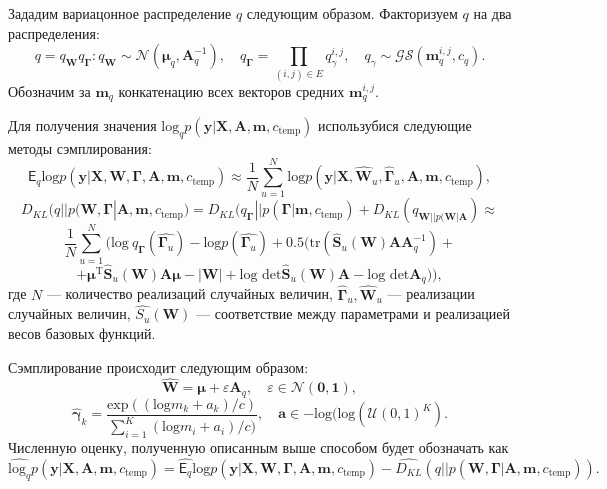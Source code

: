 Зададим вариацонное распределение $q$ следующим образом. 
Факторизуем $q$ на два распределения: 
$$q = q_{\mathbf{W}}q_{\boldsymbol{\Gamma}}:
q_{\mathbf{W}} \sim \mathcal{N}(\boldsymbol{\mu}_q, \mathbf{A}^{-1}_q), \quad q_{\boldsymbol{\Gamma}} = \prod_{(i,j) \in E} q_\gamma^{i,j}, \quad q_\gamma \sim \mathcal{GS}( \mathbf{m}_q^{i,j}, c_q).$$
Обозначим за $\mathbf{m}_q$ конкатенацию всех векторов средних  $\mathbf{m}_q^{i,j}$.

Для получения значения $\text{log}_q {p}(\mathbf{y}|\mathbf{X},\mathbf{A},\mathbf{m}, c_{\text{temp}})$ использубися следующие методы сэмплирования:
$$
    \mathsf{E}_{q}\text{log} p(\mathbf{y}|\mathbf{X},\mathbf{W}, \boldsymbol{\Gamma}, \mathbf{A},\mathbf{m}, c_{\text{temp}}) \approx \frac{1}{N}\sum_{u =1}^{N} \text{log} p(\mathbf{y}|\mathbf{X},\hat{\mathbf{W}}_u, \hat{\boldsymbol{\Gamma}}_u, \mathbf{A},\mathbf{m}, c_{\text{temp}}),
$$
$$
   {D_{KL}}(q||p(\mathbf{W}, \boldsymbol{\Gamma}| \mathbf{A},\mathbf{m}, c_{\text{temp}}) = {D_{KL}}(q_{\boldsymbol{\Gamma}}||p(\boldsymbol{\Gamma}| \mathbf{m}, c_{\text{temp}}) + {D_{KL}}(q_{\mathbf{W}||p(\mathbf{W}|\mathbf{A}}) \approx
$$
$$
    \frac{1}{N}\sum_{u=1}^N (\text{log}~q_{\boldsymbol{\Gamma}}(\hat{\boldsymbol{\Gamma}_u}) - \text{log}p(\hat{\boldsymbol{\Gamma}_u}) + 0.5(\text{tr}(\hat{\mathbf{S}}_u(\mathbf{W})\mathbf{A}\mathbf{A}_q^{-1}) + $$
$$+\boldsymbol{\mu}^{\text{T}}\hat{\mathbf{S}}_u(\mathbf{W})\mathbf{A}\boldsymbol{\mu} - |\mathbf{W}| + \text{log det}\hat{\mathbf{S}}_u(\mathbf{W})\mathbf{A} -  \text{log det}\mathbf{A}_q )),
$$
где $N$ --- количество реализаций случайных величин, $\hat{\boldsymbol{\Gamma}}_u, \hat{\mathbf{W}}_u$ --- реализации случайных величин, $\hat{S_u}(\mathbf{W})$ --- соответствие между параметрами и реализацией весов базовых функций.

Сэмплирование происходит следующим образом:
$$
    \hat{\mathbf{W}} = \boldsymbol{\mu} + \varepsilon\mathbf{A}_q, \quad \varepsilon \in \mathcal{N}(\mathbf{0}, \mathbf{1}),
$$
$$
    \hat{\boldsymbol{\gamma}}_k = \frac{\text{exp}((\text{log}{m}_k + a_k) / c )}{\sum_{i=1}^K (\text{log}{m}_i + a_i) / c )}, \quad \mathbf{a} \in -\text{log}(\text{log}(\mathcal{U}(0, 1)^K).
$$
Численную оценку, полученную описанным выше способом будет обозначать как 
$$\hat{\text{log}_q} {p}(\mathbf{y}|\mathbf{X},\mathbf{A},\mathbf{m}, c_{\text{temp}}) = \hat{\mathsf{E}_{q}}\text{log} p(\mathbf{y}|\mathbf{X},\mathbf{W}, \boldsymbol{\Gamma}, \mathbf{A},\mathbf{m}, c_{\text{temp}}) - \hat{D_{KL}}(q||p(\mathbf{W}, \boldsymbol{\Gamma}| \mathbf{A},\mathbf{m}, c_{\text{temp}})).$$

